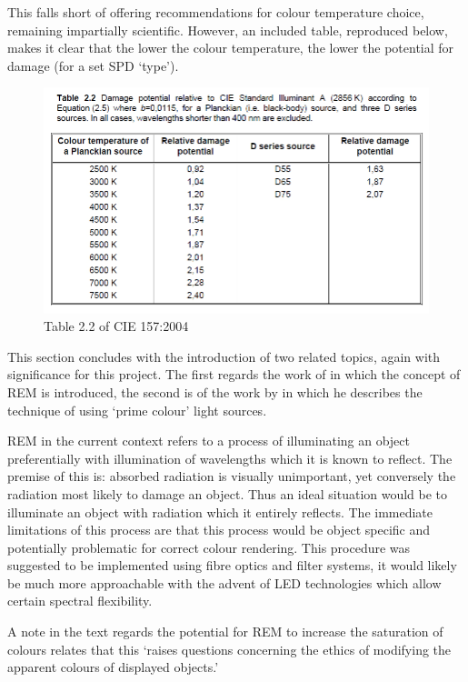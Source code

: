 This falls short of offering recommendations for colour temperature choice, remaining impartially scientific. However, an included table, reproduced below, makes it clear that the lower the colour temperature, the lower the potential for damage (for a set SPD `type').

\begin{figure}[htbp]
\includegraphics[max width=\textwidth]{figs/LitRev/CIE2004b.png}
\caption{Table 2.2 of \gls{CIE} 157:2004 \citep{cie_cie_2004}}
\label{fig:CIE2004b}
\end{figure}

This section concludes with the introduction of two related topics, again with significance for this project. The first regards the work of \citet{miller_evaluating_1993} in which the concept of \gls{REM} is introduced, the second is of the work by \citet{thornton_high_1975} in which he describes the technique of using `prime colour' light sources.

\gls{REM} in the current context refers to a process of illuminating an object preferentially with illumination of wavelengths which it is known to reflect. The premise of this is: absorbed radiation is visually unimportant, yet conversely the radiation most likely to damage an object. Thus an ideal situation would be to illuminate an object with radiation which it entirely reflects. The immediate limitations of this process are that this process would be object specific and potentially problematic for correct colour rendering. This procedure was suggested to be implemented using fibre optics and filter systems, it would likely be much more approachable with the advent of LED technologies which allow certain spectral flexibility.

A note in the text regards the potential for \gls{REM} to increase the saturation of colours relates that this `raises questions concerning the ethics of modifying the apparent colours of displayed objects.' 

